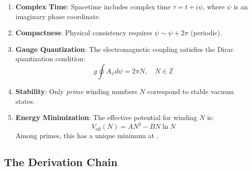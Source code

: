 \documentclass[12pt, a4paper]{article}
\begin{document}
\begin{enumerate}
\item \textbf{Complex Time}: Spacetime includes complex time $\tau = t + i\psi$, where $\psi$ is an imaginary phase coordinate.

\item \textbf{Compactness}: Physical consistency requires $\psi \sim \psi + 2\pi$ (periodic).

\item \textbf{Gauge Quantization}: The electromagnetic coupling satisfies the Dirac quantization condition:
\begin{equation}
g \oint A_\psi d\psi = 2\pi N, \quad N \in \mathbb{Z}
\end{equation}

\item \textbf{Stability}: Only \emph{prime} winding numbers $N$ correspond to stable vacuum states.

\item \textbf{Energy Minimization}: The effective potential for winding $N$ is:
\begin{equation}
V_{\text{eff}}(N) = AN^2 - BN\ln N
\end{equation}
Among primes, this has a unique minimum at .
\end{enumerate}

\subsection{The Derivation Chain}

\begin{center}
\end{center}
\end{document}

